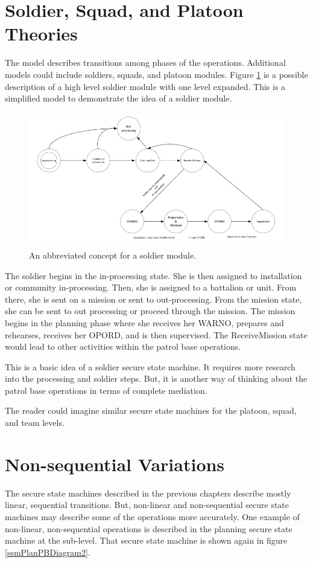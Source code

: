 \documentclass[../../main/main.tex]{subfiles}
\begin{document}
 \section{Soldier, Squad, and Platoon Theories}
The model describes transitions among phases of the operations.  Additional models could include soldiers, squads, and platoon modules.  Figure \ref{soldierMission} is a possible description of a high level soldier module with one level expanded.  This is a simplified model to demonstrate the idea of a soldier module.  

\begin{figure}[h]
\includegraphics[width=\textwidth]{../figures/soldierMission}
\caption{\label{soldierMission}An abbreviated concept for a soldier module.}
\end{figure}

The soldier begins in the in-processing state.  She is then assigned to installation or community in-processing.  Then, she is assigned to a battalion or unit.  From there, she is sent on a mission or sent to out-processing.  From the mission state, she can be sent to out processing or proceed through the mission.  The mission begins in the planning phase where she receives her WARNO, prepares and rehearses, receives her OPORD, and is then supervised.  The ReceiveMission state would lead to other activities within the patrol base operations.

This is a basic idea of a soldier secure state machine.  It requires more research into the processing and soldier steps.  But, it is another way of thinking about the patrol base operations in terms of complete mediation.

The reader could imagine similar secure state machines for the platoon, squad, and team levels.  

 \section{Non-sequential Variations}
 The secure state machines described in the previous chapters describe mostly linear, sequential transitions.  But, non-linear and non-sequential secure state machines may describe some of the operations more accurately.  One example of non-linear, non-sequential operations is described in the planning secure state machine at the sub-level.  That secure state machine is shown again in figure \ref{ssmPlanPBDiagram2}.
 
\end{document}
